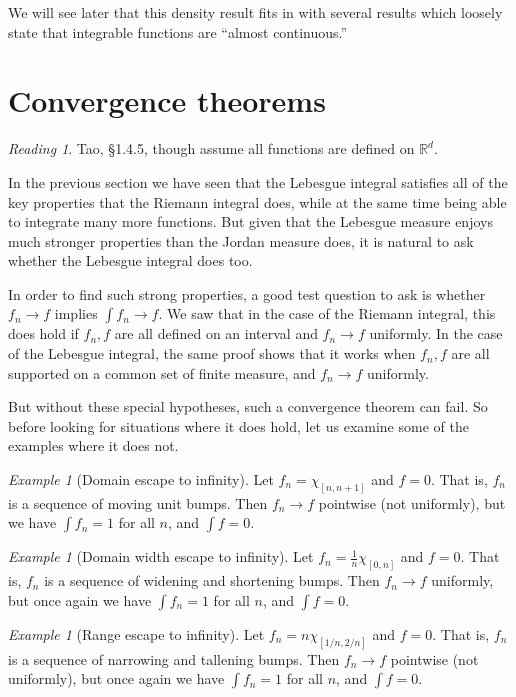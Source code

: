 \documentclass[11pt,oneside]{amsbook}
\newcommand{\RR}{{\mathbb R}}
\theoremstyle{definition}
\theoremstyle{plain}
\theoremstyle{definition}
\theoremstyle{remark}
\newtheorem{example}[thm]{Example}
\newtheorem*{reading}{Reading}
\numberwithin{equation}{section}
\numberwithin{figure}{section}
\begin{document}
We will see later that this density result fits in with several results which loosely state that integrable functions are ``almost continuous.''

\newpage
\section{Convergence theorems}

\begin{reading}
  Tao, \S 1.4.5, though assume all functions are defined on $\RR^d$.
\end{reading}

In the previous section we have seen that the Lebesgue integral satisfies all of the key properties that the Riemann integral does, while at the same time being able to integrate many more functions. But given that the Lebesgue measure enjoys much stronger properties than the Jordan measure does, it is natural to ask whether the Lebesgue integral does too.

In order to find such strong properties, a good test question to ask is whether $f_n\to f$ implies $\int f_n\to f$. We saw that in the case of the Riemann integral, this does hold if $f_n,f$ are all defined on an interval and $f_n\to f$ uniformly. In the case of the Lebesgue integral, the same proof shows that it works when $f_n,f$ are all supported on a common set of finite measure, and $f_n\to f$ uniformly.

But without these special hypotheses, such a convergence theorem can fail. So before looking for situations where it does hold, let us examine some of the examples where it does not.

\begin{example}[Domain escape to infinity]
  Let $f_n=\chi_{[n,n+1]}$ and $f=0$. That is, $f_n$ is a sequence of moving unit bumps. Then $f_n\to f$ pointwise (not uniformly), but we have $\int f_n=1$ for all $n$, and $\int f=0$.
\end{example}

\begin{example}[Domain width escape to infinity]
  Let $f_n=\frac1n\chi_{[0,n]}$ and $f=0$. That is, $f_n$ is a sequence of widening and shortening bumps. Then $f_n\to f$ uniformly, but once again we have $\int f_n=1$ for all $n$, and $\int f=0$.
\end{example}

\begin{example}[Range escape to infinity]
  Let $f_n=n\chi_{[1/n,2/n]}$ and $f=0$. That is, $f_n$ is a sequence of narrowing and tallening bumps. Then $f_n\to f$ pointwise (not uniformly), but once again we have $\int f_n=1$ for all $n$, and $\int f=0$.
\end{example}
\end{document}
